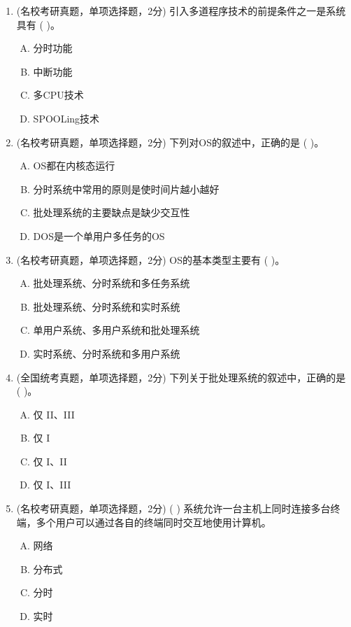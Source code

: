 \documentclass[lang=cn,newtx,10pt,scheme=chinese]{../../elegantbook}
\begin{document}
\begin{enumerate}
    \item (名校考研真题，单项选择题，2分) 引入多道程序技术的前提条件之一是系统具有 (    )。
    \begin{enumerate}[A.]
        \item 分时功能
        \item 中断功能
        \item 多CPU技术
        \item SPOOLing技术
    \end{enumerate}

    \item (名校考研真题，单项选择题，2分) 下列对OS的叙述中，正确的是 (    )。
    \begin{enumerate}[A.]
        \item OS都在内核态运行
        \item 分时系统中常用的原则是使时间片越小越好
        \item 批处理系统的主要缺点是缺少交互性
        \item DOS是一个单用户多任务的OS
    \end{enumerate}

    \item (名校考研真题，单项选择题，2分) OS的基本类型主要有 (    )。
    \begin{enumerate}[A.]
        \item 批处理系统、分时系统和多任务系统
        \item 批处理系统、分时系统和实时系统
        \item 单用户系统、多用户系统和批处理系统
        \item 实时系统、分时系统和多用户系统
    \end{enumerate}

    \item (全国统考真题，单项选择题，2分) 下列关于批处理系统的叙述中，正确的是 (    )。
    \begin{enumerate}[A.]
        \item 仅 II、III
        \item 仅 I
        \item 仅 I、II
        \item 仅 I、III
    \end{enumerate}

    \item (名校考研真题，单项选择题，2分) (    ) 系统允许一台主机上同时连接多台终端，多个用户可以通过各自的终端同时交互地使用计算机。
    \begin{enumerate}[A.]
        \item 网络
        \item 分布式
        \item 分时
        \item 实时
    \end{enumerate}


\end{enumerate}
\end{document}
